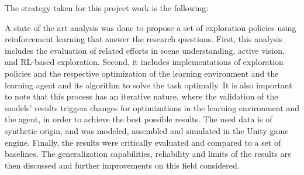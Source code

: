 The strategy taken for this project work is the following:

A state of the art analysis was done to propose a set of exploration policies using reinforcement learning that answer the research questions. 
First, this analysis includes the evaluation of related efforts in scene understanding, active vision, and RL-based exploration.
Second, it includes implementations of exploration policies and the respective optimization of the learning environment and the learning agent and its algorithm to solve the task optimally. 
It is also important to note that this process has an iterative nature, where the validation of the models' results triggers changes for optimizations in the learning environment and the agent, 
in order to achieve the best possible results. The used data is of synthetic origin, and was modeled, assembled and simulated in the Unity game engine. Finally, the results were critically evaluated and compared to a set of baselines. The generalization capabilities, reliability and limits of the results are then discussed and further improvements on this field considered. 

